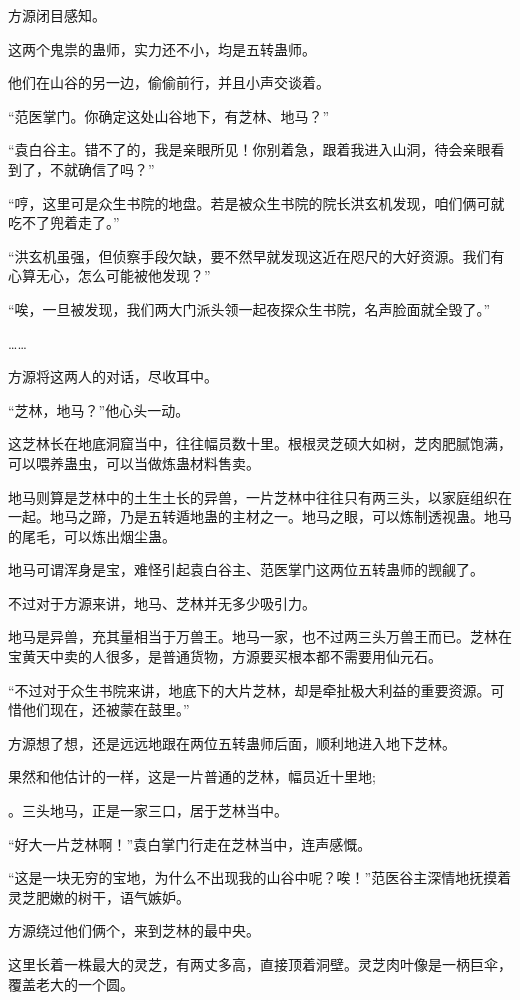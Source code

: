 \begin{this_body}
方源闭目感知。

这两个鬼祟的蛊师，实力还不小，均是五转蛊师。

他们在山谷的另一边，偷偷前行，并且小声交谈着。

“范医掌门。你确定这处山谷地下，有芝林、地马？”

“袁白谷主。错不了的，我是亲眼所见！你别着急，跟着我进入山洞，待会亲眼看到了，不就确信了吗？”

“哼，这里可是众生书院的地盘。若是被众生书院的院长洪玄机发现，咱们俩可就吃不了兜着走了。”

“洪玄机虽强，但侦察手段欠缺，要不然早就发现这近在咫尺的大好资源。我们有心算无心，怎么可能被他发现？”

“唉，一旦被发现，我们两大门派头领一起夜探众生书院，名声脸面就全毁了。”

……

方源将这两人的对话，尽收耳中。

“芝林，地马？”他心头一动。

这芝林长在地底洞窟当中，往往幅员数十里。根根灵芝硕大如树，芝肉肥腻饱满，可以喂养蛊虫，可以当做炼蛊材料售卖。

地马则算是芝林中的土生土长的异兽，一片芝林中往往只有两三头，以家庭组织在一起。地马之蹄，乃是五转遁地蛊的主材之一。地马之眼，可以炼制透视蛊。地马的尾毛，可以炼出烟尘蛊。

地马可谓浑身是宝，难怪引起袁白谷主、范医掌门这两位五转蛊师的觊觎了。

不过对于方源来讲，地马、芝林并无多少吸引力。

地马是异兽，充其量相当于万兽王。地马一家，也不过两三头万兽王而已。芝林在宝黄天中卖的人很多，是普通货物，方源要买根本都不需要用仙元石。

“不过对于众生书院来讲，地底下的大片芝林，却是牵扯极大利益的重要资源。可惜他们现在，还被蒙在鼓里。”

方源想了想，还是远远地跟在两位五转蛊师后面，顺利地进入地下芝林。

果然和他估计的一样，这是一片普通的芝林，幅员近十里地;

。三头地马，正是一家三口，居于芝林当中。

“好大一片芝林啊！”袁白掌门行走在芝林当中，连声感慨。

“这是一块无穷的宝地，为什么不出现我的山谷中呢？唉！”范医谷主深情地抚摸着灵芝肥嫩的树干，语气嫉妒。

方源绕过他们俩个，来到芝林的最中央。

这里长着一株最大的灵芝，有两丈多高，直接顶着洞壁。灵芝肉叶像是一柄巨伞，覆盖老大的一个圆。


\end{this_body}
